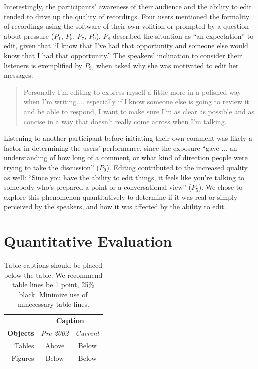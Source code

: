 \documentclass{sigchi}
\begin{document}
Interestingly, the participants' awareness of their audience and the ability to edit tended to drive up the quality of recordings.
Four users mentioned the formality of recordings using the software of their own volition or prompted by a question about pressure ($P_1,\,P_5,\,P_7,\,P_9$). 
$P_8$ described the situation as ``an expectation'' to edit, given that ``I know that I've had that opportunity and someone else would know that I had that opportunity.'' 
The speakers' inclination to consider their listeners is exemplified by $P_9$, when asked why she was motivated to edit her messages:
\begin{quote}
	Personally I'm editing to express myself a little more in a polished way when I'm writing.... especially if I know someone else is going to review it and be able to respond, I want to make sure I'm as clear as possible and as concise in a way that doesn’t really come across when I'm talking.
\end{quote}
Listening to another participant before initiating their own comment was likely a factor in determining the users' performance, since the exposure ``gave ... an understanding of how long of a comment, or what kind of direction people were trying to take the discussion'' ($P_9$). 
Editing contributed to the increased quality as well: ``Since you have the ability to edit things, it feels like you're talking to somebody who's prepared a point or a conversational view'' ($P_5$). 
We chose to explore this phenomenon quantitatively to determine if it was real or simply perceived by the speakers, and how it was affected by the ability to edit.

\section{Quantitative Evaluation}


\begin{table}
  \centering
  \begin{tabular}{r c c}
    \toprule
    & \multicolumn{2}{c}{\small{\textbf{Caption}}} \\
    \cmidrule(r){2-3}
    {\small\textbf{Objects}}
    & {\small \textit{Pre-2002}}
    & {\small \textit{Current}} \\
    \midrule
    Tables & Above & Below \\
    Figures & Below & Below \\
    \bottomrule
  \end{tabular}
  \caption{Table captions should be placed below the table. We
    recommend table lines be 1 point, 25\% black. Minimize use of
    unnecessary table lines.}~\label{tab:table1}
\end{table}
\end{document}
